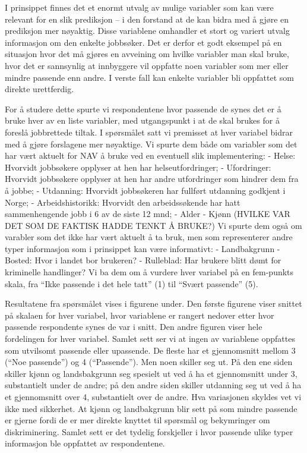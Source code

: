 \documentclass[
]{book}
\begin{document}
I prinsippet finnes det et enormt utvalg av mulige variabler som kan være relevant for en slik prediksjon -- i den forstand at de kan bidra med å gjøre en prediksjon mer nøyaktig. Disse variablene omhandler et stort og variert utvalg informasjon om den enkelte jobbsøker. Det er derfor et godt eksempel på en situasjon hvor det må gjøres en avveining om hvilke variabler man skal bruke, hvor det er sannsynlig at innbyggere vil oppfatte noen variabler som mer eller mindre passende enn andre. I verste fall kan enkelte variabler bli oppfattet som direkte urettferdig.

For å studere dette spurte vi respondentene hvor passende de synes det er å bruke hver av en liste variabler, med utgangspunkt i at de skal brukes for å foreslå jobbrettede tiltak. I spørsmålet satt vi premisset at hver variabel bidrar med å gjøre forslagene mer nøyaktige. Vi spurte dem både om variabler som det har vært aktuelt for NAV å bruke ved en eventuell slik implementering:
- Helse: Hvorvidt jobbsøkere opplyser at hen har helseutfordringer;
- Ufordringer: Hvorvidt jobbsøkere opplyser at hen har andre utfordringer som hindrer dem fra å jobbe;
- Utdanning: Hvorvidt jobbsøkeren har fullført utdanning godkjent i Norge;
- Arbeidshistorikk: Hvorvidt den arbeidssøkende har hatt sammenhengende jobb i 6 av de siste 12 mnd;
- Alder
- Kjønn
(HVILKE VAR DET SOM DE FAKTISK HADDE TENKT Å BRUKE?)
Vi spurte dem også om varabler som det ikke har vært aktuelt å ta bruk, men som representerer andre typer informasjon som i prinsippet kan være informativt:
- Landbakgrunn
- Bosted: Hvor i landet bor brukeren?
- Rulleblad: Har brukere blitt dømt for kriminelle handlinger?
Vi ba dem om å vurdere hver variabel på en fem-punkts skala, fra ``Ikke passende i det hele tatt'' (1) til ``Svært passende'' (5).

Resultatene fra spørsmålet vises i figurene under.
Den første figurene viser snittet på skalaen for hver variabel, hvor variablene er rangert nedover etter hvor passende respondente synes de var i snitt. Den andre figuren viser hele fordelingen for hver variabel. Samlet sett ser vi at ingen av variablene oppfattes som utvilsomt passende eller upassende. De fleste har et gjennomsnitt mellom 3 (``Noe passende'') og 4 (``Passende''). Men noen skiller seg ut. På den ene siden skiller kjønn og landsbakgrunn seg spesielt ut ved å ha et gjennomsnitt under 3, substantielt under de andre; på den andre siden skiller utdanning seg ut ved å ha et gjennomsnitt over 4, substantielt over de andre. Hva variasjonen skyldes vet vi ikke med sikkerhet. At kjønn og landbakgrunn blir sett på som mindre passende er gjerne fordi de er mer direkte knyttet til spørsmål og bekymringer om diskriminering. Samlet sett er det tydelig forskjeller i hvor passende ulike typer informasjon ble oppfattet av respondentene.
\end{document}
